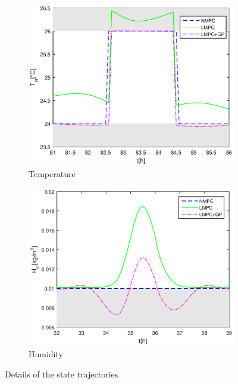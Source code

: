 \begin{figure}[t]
	\begin{subfigure}[t]{0.49\textwidth}
		\includegraphics[width=\textwidth]{../Figures/economic_detail_temperature.eps}
		\caption{Temperature}
		\label{fig:eco_det_temp}
	\end{subfigure}
	\hfill
	\begin{subfigure}[t]{0.49\textwidth}
		\includegraphics[width=\textwidth]{../Figures/economic_detail_humidity.eps}
		\caption{Humidity}
		\label{fig:eco_det_hum}
	\end{subfigure}
\caption{Details of the state trajectories}
\label{fig:detail_state_traj}
\end{figure}


